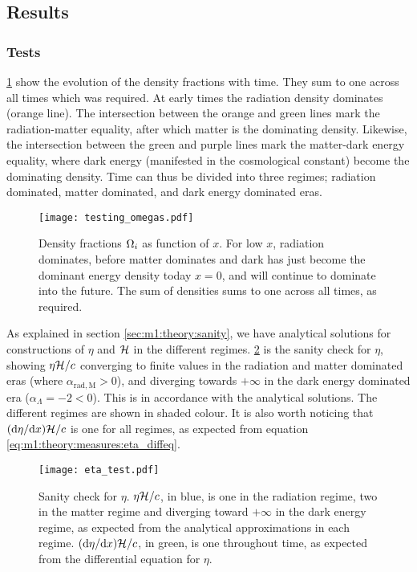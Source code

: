 \subsection{Results}\label{sec:m1:results}

\subsubsection{Tests}\label{sec:m1:results:tests}
    \cref{fig:m1:omega_tests} show the evolution of the density fractions with time. They sum to one across all times which was required. At early times the radiation density dominates (orange line). The intersection between the orange and green lines mark the radiation-matter equality, after which matter is the dominating density. Likewise, the intersection between the green and purple lines mark the matter-dark energy equality, where dark energy (manifested in the cosmological constant) become the dominating density. Time can thus be divided into three regimes; radiation dominated, matter dominated, and dark energy dominated eras. 
    \begin{figure}
        \texttt{[image: testing\_omegas.pdf]}
        \caption{Density fractions $\Omega_i$ as function of $x$. For low $x$, radiation dominates, before matter dominates and dark has just become the dominant energy density today $x=0$, and will continue to dominate into the future. The sum of densities sums to one across all times, as required.}
        \label{fig:m1:omega_tests}
    \end{figure}

    As explained in section \cref{sec:m1:theory:sanity}, we have analytical solutions for constructions of $\eta$ and $\mathcal{H}$ in the different regimes. \cref{fig:m1:eta_tests} is the sanity check for $\eta$, showing $\eta\mathcal{H}/c$ converging to finite values in the radiation and matter dominated eras (where $\alpha_{\mathrm{rad}, \mathrm{M}}>0$), and diverging towards $+\infty$ in the dark energy dominated era ($\alpha_\Lambda =-2 <0$). This is in accordance with the analytical solutions. The different regimes are shown in shaded colour. It is also worth noticing that $(\mathrm{d} \eta /\mathrm{d} x)\mathcal{H}/c$ is one for all regimes, as expected from equation \cref{eq:m1:theory:measures:eta_diffeq}.

    \begin{figure}
        \texttt{[image: eta\_test.pdf]}
        \caption{Sanity check for $\eta$. $\eta\mathcal{H}/c$, in blue, is one in the radiation regime, two in the matter regime and diverging toward $+\infty$ in the dark energy regime, as expected from the analytical approximations in each regime. $(\mathrm{d} \eta /\mathrm{d} x)\mathcal{H}/c$, in green, is one throughout time, as expected from the differential equation for $\eta$.}
        \label{fig:m1:eta_tests}
    \end{figure}

